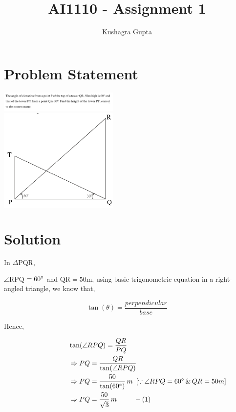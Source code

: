 \documentclass[twocoloumn]{article}
\title{AI1110 - Assignment 1}
\author{Kushagra Gupta}
\begin{document}
\maketitle 
\begin{multicols}{2}
\section*{Problem Statement}

\begin{center}
\includegraphics[width=167.5pt]{Q.png}\\
\includegraphics[width=167.5pt]{figure.png}
\end{center}

\section*{Solution}

In $\Delta$PQR, 

$\angle$RPQ  $= 60\degree$ and QR$ = 50$m, using basic trigonometric equation in a right-angled triangle, we know that,

$$\tan(\theta)=\frac{perpendicular}{base}$$

\noindent Hence, 

\begin{align*}
\hspace{60pt}&\tan(\angle RPQ) = \frac{QR}{PQ} \\
&\Rightarrow PQ = \frac{QR}{\tan(\angle RPQ)} \\
&\Rightarrow PQ = \frac{50}{\tan(60\degree)}\, m
\hspace{5pt}[\because \angle RPQ = 60\degree \, \& \, QR = 50m] \\
&\Rightarrow PQ = \frac{50}{\sqrt{3}}\, m \hspace{25pt}-(1)
\end{align*}


\end{multicols}
\end{document}
